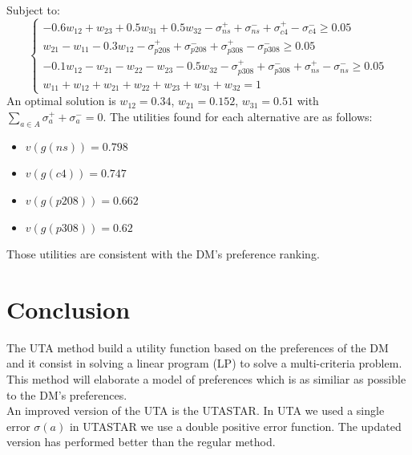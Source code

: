 \documentclass{report}
\begin{document}
Subject to: \\
\begin{equation}
	\begin{cases}
		 -0.6w_{12} + w_{23} + 0.5w_{31} + 0.5w_{32}  -\sigma _{ns}^{+} +\sigma _{ns}^{-} +\sigma _{c4}^{+} - \sigma _{c4}^{-}   \geq 0.05\\
		w_{21} - w_{11} - 0.3w_{12} -\sigma _{p208}^{+} +\sigma _{p208}^{-} +\sigma _{p308}^{+} - \sigma _{p308}^{-}  \geq 0.05 \\
		- 0.1w_{12} - w_{21} - w_{22} - w_{23} - 0.5w_{32} -\sigma _{p308}^{+} +\sigma _{p308}^{-} +\sigma _{ns}^{+} - \sigma _{ns}^{-}  \geq 0.05 \\
		w_{11} + w_{12} + w_{21} + w_{22} + w_{23} + w_{31} + w_{32} = 1
	\end{cases}
\end{equation}
An optimal solution is $w_{12} = 0.34$, $w_{21} = 0.152$, $w_{31} = 0.51$ with $\sum_{a \in A} \sigma _{a}^{+} + \sigma _{a}^{-} = 0$. The utilities found for each alternative are as follows: \\ 
\begin{itemize}
\item $v(g(ns)) = 0.798$
\item $v(g(c4)) = 0.747$
\item $v(g(p208)) = 0.662 $
\item $v(g(p308)) = 0.62 $
\end{itemize}
Those utilities are consistent with the DM's preference ranking. 
\chapter{Conclusion}
The UTA method build a utility function based on the preferences of the DM and it consist in solving a linear program (LP) to solve a multi-criteria problem.\\

This method will elaborate a model of preferences which is as similiar as possible to the DM's preferences.\\

An improved version of the UTA is the UTASTAR. In UTA we used a single error $\sigma(a)$ in UTASTAR we use a double positive error function. The updated version has performed better than the regular method.
\end{document}
